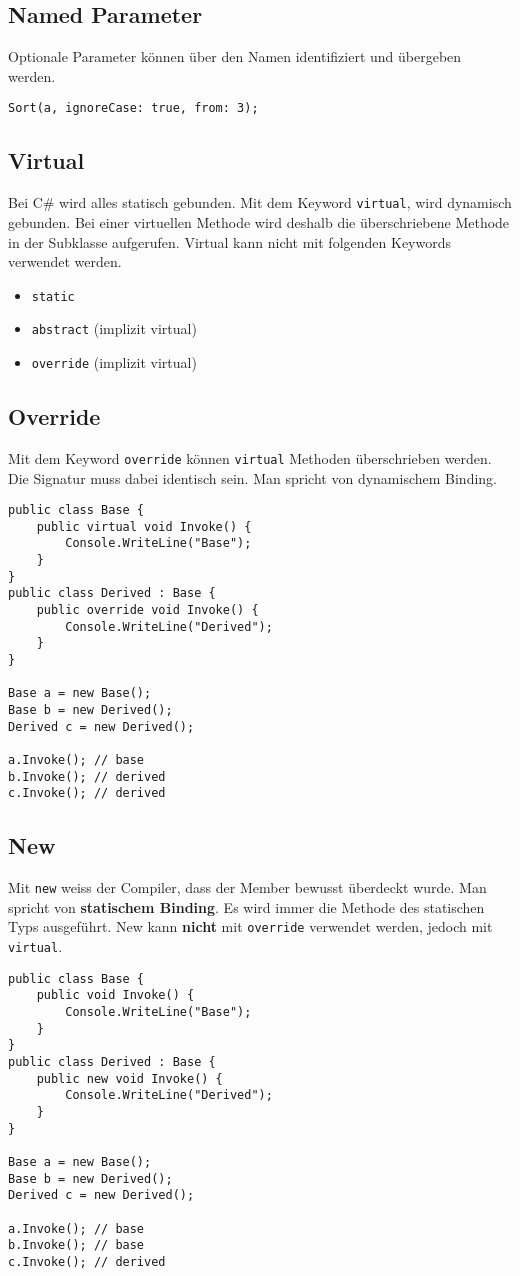 \subsection{Named Parameter}
Optionale Parameter können über den Namen identifiziert und übergeben werden.
\begin{lstlisting}
Sort(a, ignoreCase: true, from: 3);
\end{lstlisting}

\subsection{Virtual}
Bei C\# wird alles statisch gebunden. Mit dem Keyword \lstinline|virtual|, wird dynamisch gebunden. Bei einer virtuellen Methode wird deshalb die überschriebene Methode in der Subklasse aufgerufen. Virtual kann nicht mit folgenden Keywords verwendet werden.
\begin{itemize}
	\item \lstinline|static|
	\item \lstinline|abstract| (implizit virtual)
	\item \lstinline|override| (implizit virtual)
\end{itemize} 

\subsection{Override}
Mit dem Keyword \lstinline|override| können \lstinline|virtual| Methoden überschrieben werden. Die Signatur muss dabei identisch sein. Man spricht von dynamischem Binding.


\begin{lstlisting}
public class Base {
	public virtual void Invoke() {
		Console.WriteLine("Base");
	}
}
public class Derived : Base {
	public override void Invoke() {
		Console.WriteLine("Derived");
	}
}

Base a = new Base();
Base b = new Derived();
Derived c = new Derived();

a.Invoke(); // base
b.Invoke(); // derived
c.Invoke(); // derived
\end{lstlisting}

\clearpage

\subsection{New}
Mit \lstinline|new| weiss der Compiler, dass der Member bewusst überdeckt wurde. Man spricht von \textbf{statischem Binding}. Es wird immer die Methode des statischen Typs ausgeführt. New kann \textbf{nicht} mit \lstinline|override| verwendet werden, jedoch mit \lstinline|virtual|.
\begin{lstlisting} 
public class Base {
	public void Invoke() {
		Console.WriteLine("Base");
	}
}
public class Derived : Base {
	public new void Invoke() {
		Console.WriteLine("Derived");
	}
}

Base a = new Base();
Base b = new Derived();
Derived c = new Derived();

a.Invoke(); // base
b.Invoke(); // base
c.Invoke(); // derived
\end{lstlisting}

